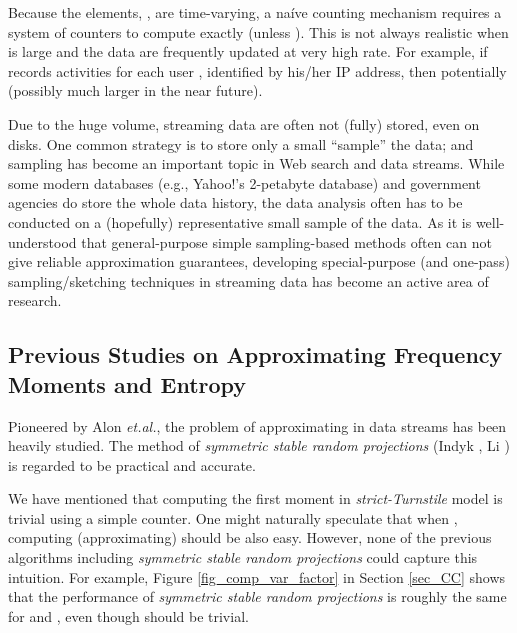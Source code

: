 \documentclass{sig-alternate}
\begin{document}
Because the elements, , are time-varying,  a na\'ive counting mechanism requires a system of  counters to compute  exactly (unless ). This is not always realistic when  is large and the data are  frequently updated at very high rate.  For example, if  records activities for each user , identified by his/her IP address, then potentially  (possibly much larger in the near future).

Due to the huge volume, streaming data are often not (fully) stored, even on disks\cite{Proc:Babcock_PODS02}.  One common strategy is to store only a small ``sample'' the data; and sampling has become an important topic in Web search and data streams\cite{Proc:Henzinger_WWW00,Proc:Bar-Yossef_VLDB00,Article:Henzinger_03}. While some modern databases (e.g., Yahoo!'s 2-petabyte database) and government agencies do store the whole data history, the data analysis  often has to be conducted on a (hopefully) representative small sample of the data. As it is well-understood that  general-purpose simple sampling-based methods often can not give reliable approximation guarantees\cite{Proc:Babcock_PODS02}, developing special-purpose (and one-pass) sampling/sketching techniques in streaming data has become an active area of research.

\subsection{Previous Studies on Approximating Frequency Moments and Entropy}

Pioneered by Alon {\it et.al.}\cite{Proc:Alon_STOC96}, the problem of approximating  in data streams has been heavily studied\cite{Proc:Feigenbaum_FOCS99,Proc:Indyk_FOCS00,Proc:Saks_STOC02,Proc:Kumar_FOCS02,Proc:Indyk_STOC05,Proc:Woodruff_SODA04,Proc:Ganguly_RANDOM07}. The method of {\em symmetric stable random projections} (Indyk \cite{Article:Indyk_JACM06}, Li \cite{Proc:Li_SODA08}) is regarded to be  practical and accurate.

We have mentioned that computing the first moment  in {\em strict-Turnstile} model is trivial using a simple counter. One might naturally speculate that when , computing (approximating)  should be also easy. However, none of the previous algorithms including {\em symmetric stable random projections} could capture this intuition. For example, Figure \ref{fig_comp_var_factor} in Section \ref{sec_CC} shows that the performance of {\em symmetric stable random projections} is roughly the same for  and , even though  should be trivial.
\end{document}
